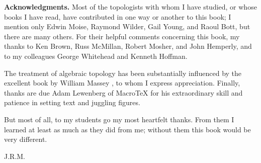 \noindent\textbf{Acknowledgments. }Most of the topologists with whom I have studied, 
or whose books I have read, have contributed in one way or another to this book; 
I mention only Edwin Moise, Raymond Wilder, Gail Young, and Raoul Bott, but there 
are many others. For their helpful comments concerning this book, my thanks to Ken 
Brown, Russ McMillan, Robert Mosher, and John Hemperly, and to my colleagues George 
Whitehead and Kenneth Hoffman.

The treatment of algebraic topology has been substantially influenced by the 
excellent book by William Massey \cite{Massey1990}, to whom I express appreciation. Finally, 
thanks are due Adam Lewenberg of MacroTeX for his extraordinary skill and patience 
in setting text and juggling figures.

But most of all, to my students go my most heartfelt thanks. From them I 
learned at least as much as they did from me; without them this book would be very 
different.

\begin{flushright}
J.R.M.
\end{flushright}